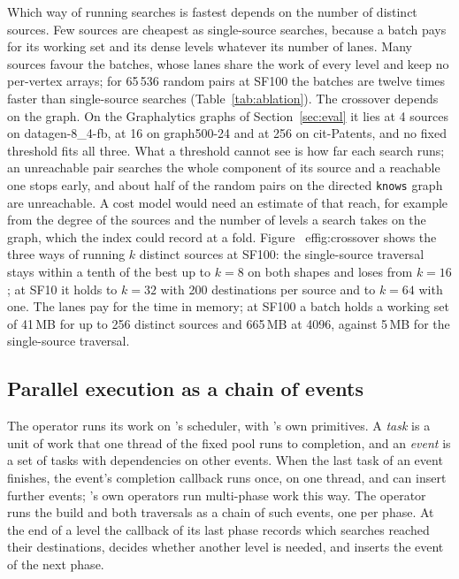 Which way of running searches is fastest depends on the number of distinct sources. Few sources are cheapest as single-source searches, because a batch pays for its working
set and its dense levels whatever its number of lanes. Many sources favour the batches, whose lanes share
the work of every level and keep no per-vertex arrays; for 65\,536 random pairs at SF100 the batches are twelve times faster than single-source searches (Table~\ref{tab:ablation}). The crossover depends on the graph. On the Graphalytics graphs of Section~\ref{sec:eval} it lies at 4 sources on
datagen-8\_4-fb, at 16 on graph500-24 and at 256 on cit-Patents, and no fixed threshold fits all three. What a threshold cannot see is how far each search runs; an unreachable pair searches the whole component of its source and a reachable one stops early, and about half of the random pairs on the directed \texttt{knows} graph are unreachable. A cost model would need an estimate of that reach, for example from the degree of the sources and the number of levels a search takes on the graph, which the index could record at a fold. Figure~
ef{fig:crossover} shows the three ways of running $k$ distinct sources at SF100: the single-source traversal
stays within a tenth of the best up to $k = 8$ on both shapes and loses from $k = 16$; at SF10 it holds to $k = 32$
with 200 destinations per source and to $k = 64$ with one. The lanes pay for the time in memory; at SF100 a batch holds a working set of 41\,MB for up to 256 distinct sources and 665\,MB at 4096, against 5\,MB for the single-source traversal.

\subsection{Parallel execution as a chain of events}
\label{sec:phases}

The operator runs its work on \duckdb's scheduler, with \duckdb's own primitives. A \duckdb \emph{task} is a unit
of work that one thread of the fixed pool runs to completion, and an \emph{event} is a set of tasks with dependencies
on other events. When the last task of an event finishes, the event's completion callback runs once, on one thread,
and can insert further events; \duckdb's own operators run multi-phase work this way. The operator runs the build
and both traversals as a chain of such events, one per phase. At the end of a level the callback of its last phase
records which searches reached their destinations, decides whether another level is needed, and inserts the event of
the next phase.

